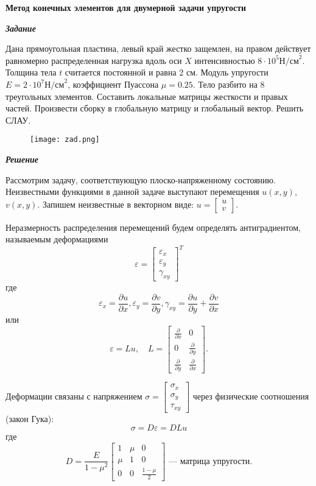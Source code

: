 \documentclass[a4paper, 12pt]{article}
\begin{document}
\begin{center}
	\textbf{Метод конечных элементов для двумерной задачи упругости}

	\textbf{\textit{Задание}}
\end{center}

Дана прямоугольная пластина, левый край жестко защемлен, на правом действует равномерно распределенная нагрузка вдоль оси $X$ интенсивностью  $8\cdot 10^5 \text{Н/см}^2$. Толщина тела $t$ считается постоянной и равна 2 см. Модуль упругости  $E=2\cdot 10^7 \text{Н/см}^2$, коэффициент Пуассона $\mu=0.25$. Тело разбито на 8 треугольных элементов. Составить локальные матрицы жесткости и правых частей. Произвести сборку в глобальную матрицу и глобальный вектор. Решить СЛАУ.

\begin{figure}[h]
	\centering
\texttt{[image: zad.png]}
\end{figure} 


\begin{center}
	\textit{\textbf{Решение}}
\end{center}

Рассмотрим задачу, соответствующую плоско-напряженному состоянию.  
Неизвестными функциями в данной задаче выступают перемещения \(u(x,y)\), \(v(x,y)\).  
Запишем неизвестные в векторном виде: \(u = \begin{bmatrix} u \\ v \end{bmatrix}\).

Неразмерность распределения перемещений будем определять антиградиентом, называемым деформациями 
\[
\varepsilon = \begin{bmatrix} \varepsilon_x \\ \varepsilon_y \\ \gamma_{xy} \end{bmatrix}^T
\]
где 
\[\varepsilon_x = \frac{\partial u}{\partial x}, \varepsilon_y = \frac{\partial v}{\partial y}, \gamma_{xy} = \frac{\partial u}{\partial y} + \frac{\partial v}{\partial x}
\]
или
\[
\varepsilon = L u, \quad L = 
\begin{bmatrix}
	\frac{\partial}{\partial x} & 0 \\
	0 & \frac{\partial}{\partial y} \\
	\frac{\partial}{\partial y} & \frac{\partial}{\partial x}
\end{bmatrix}.
\]

Деформации связаны с напряжением \(\sigma = \begin{bmatrix} \sigma_x \\ \sigma_y \\ \tau_{xy} \end{bmatrix}\) через физические соотношения (закон Гука): 
\[
\sigma = D \varepsilon = D L u
\]
где
\[
D = \frac{E}{1 - \mu^2}
\begin{bmatrix}
	1 & \mu & 0 \\
	\mu & 1 & 0 \\
	0 & 0 & \frac{1-\mu}{2}
\end{bmatrix}  \text{ — матрица упругости.}
\]
\end{document}
